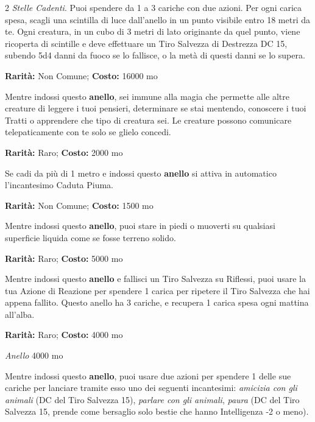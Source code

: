 \begin{multicols}{2}
\emph{Stelle Cadenti}. Puoi spendere da 1 a 3 cariche con due azioni. Per ogni carica spesa, scagli una scintilla di luce dall'anello in un punto visibile entro 18 metri da te. Ogni creatura, in un cubo di 3 metri di lato originante da quel punto, viene ricoperta di scintille e deve effettuare un Tiro Salvezza di Destrezza DC 15, subendo 5d4 danni da fuoco se lo fallisce, o la metà di questi danni se lo supera.


\textbf{Rarità:} Non Comune; \textbf{Costo:} 16000 mo

Mentre indossi questo \textbf{anello}, sei immune alla magia che permette alle altre creature di leggere i tuoi pensieri, determinare se stai mentendo, conoscere i tuoi Tratti o apprendere che tipo di creatura sei. Le creature possono comunicare telepaticamente con te solo se glielo concedi.


\textbf{Rarità:} Raro; \textbf{Costo:} 2000 mo

Se cadi da più di 1 metro e indossi questo \textbf{anello} si attiva in automatico l'incantesimo Caduta Piuma.


\textbf{Rarità:} Non Comune; \textbf{Costo:} 1500 mo

Mentre indossi questo \textbf{anello}, puoi stare in piedi o muoverti su qualsiasi superficie liquida come se fosse terreno solido.


\textbf{Rarità:} Raro; \textbf{Costo:} 5000 mo

Mentre indossi questo \textbf{anello} e fallisci un Tiro Salvezza su Riflessi, puoi usare la tua Azione di Reazione per spendere 1 carica per ripetere il Tiro Salvezza che hai appena fallito. Questo anello ha 3 cariche, e recupera 1 carica spesa ogni mattina all'alba.


\textbf{Rarità:} Raro; \textbf{Costo:} 4000 mo

\emph{Anello} 4000 mo

Mentre indossi questo \textbf{anello}, puoi usare due azioni per spendere 1 delle sue cariche per lanciare tramite esso uno dei seguenti incantesimi: \emph{amicizia con gli animali} (DC del Tiro Salvezza 15), \emph{parlare con gli animali}, \emph{paura} (DC del Tiro Salvezza 15, prende come bersaglio solo bestie che hanno Intelligenza -2 o meno).


\end{multicols}
